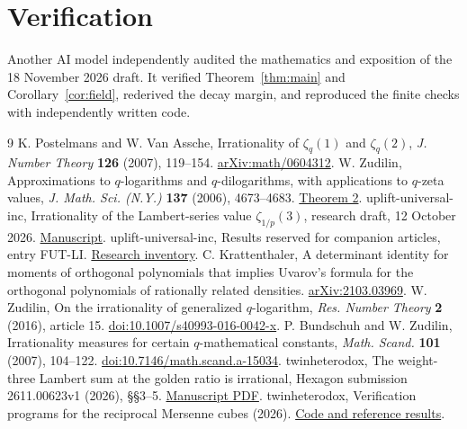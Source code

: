 \documentclass[11pt]{article}
\begin{document}
\section*{Verification}
Another AI model independently audited the mathematics and exposition
of the 18 November 2026 draft. It verified Theorem~\ref{thm:main}
and Corollary~\ref{cor:field}, rederived the decay margin, and
reproduced the finite checks with independently written code.

\small
\begin{thebibliography}{9}
\setlength{\itemsep}{1pt}
 K. Postelmans and W. Van Assche, Irrationality of
\(\zeta_q(1)\) and \(\zeta_q(2)\), \emph{J. Number Theory}
\textbf{126} (2007), 119--154. \href{https://arxiv.org/abs/math/0604312}{arXiv:math/0604312}.
 W. Zudilin, Approximations to \(q\)-logarithms
and \(q\)-dilogarithms, with applications to \(q\)-zeta values,
\emph{J. Math. Sci. (N.Y.)} \textbf{137} (2006), 4673--4683.
\href{https://www.math.ru.nl/~zudilin/PS/qhyp.pdf}{Theorem 2}.
 uplift-universal-inc, Irrationality of the Lambert-series
value \(\zeta_{1/p}(3)\), research draft, 12 October 2026.
\href{https://github.com/uplift-universal-inc/qzeta_3-irrationality/blob/main/paper/main.pdf}{Manuscript}.
 uplift-universal-inc, Results reserved for
companion articles, entry FUT-LI.
\href{https://github.com/uplift-universal-inc/qzeta_3-irrationality/blob/main/docs/FUTURE_RESULTS.md}{Research inventory}.
 C. Krattenthaler, A determinant identity for moments
of orthogonal polynomials that implies Uvarov's formula for the
orthogonal polynomials of rationally related densities.
\href{https://arxiv.org/abs/2103.03969}{arXiv:2103.03969}.
 W. Zudilin, On the irrationality of generalized
\(q\)-logarithm, \emph{Res. Number Theory} \textbf{2} (2016), article 15.
\href{https://doi.org/10.1007/s40993-016-0042-x}{doi:10.1007/s40993-016-0042-x}.
 P. Bundschuh and W. Zudilin, Irrationality measures for
certain \(q\)-mathematical constants, \emph{Math. Scand.} \textbf{101}
(2007), 104--122. \href{https://doi.org/10.7146/math.scand.a-15034}{doi:10.7146/math.scand.a-15034}.
 twinheterodox, The weight-three Lambert sum at the
golden ratio is irrational, Hexagon submission 2611.00623v1 (2026),
\S\S3--5.
\href{https://github.com/twinheterodox/algebraic-base-lambert-values/blob/main/output/pdf/algebraic-base-lambert-values.pdf}{Manuscript PDF}.
 twinheterodox, Verification programs for
the reciprocal Mersenne cubes (2026).
\href{https://github.com/twinheterodox/algebraic-base-lambert-values/tree/main/checks/mersenne}{Code and reference results}.
\end{thebibliography}
\end{document}
